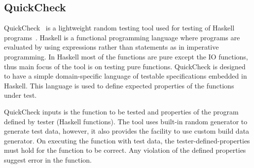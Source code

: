 \subsection{QuickCheck}
QuickCheck~\cite{claessen2011quickcheck} is a lightweight random testing tool used for testing of Haskell programs~\cite{hudak2007history}. Haskell is a functional programming language where programs are evaluated by using expressions rather than statements as in imperative programming. In Haskell most of the functions are pure except the IO functions, thus main focus of the tool is on testing pure functions. QuickCheck is designed to have a simple domain-specific language of testable specifications embedded in Haskell. This language is used to define expected properties of the functions under test. %

QuickCheck inputs is the function to be tested and properties of the program defined by tester (Haskell functions). The tool uses built-in random generator to generate test data, however, it also provides the facility to use custom build data generator. On executing the function with test data, the tester-defined-properties must hold for the function to be correct. Any violation of the defined properties suggest error in the function.







